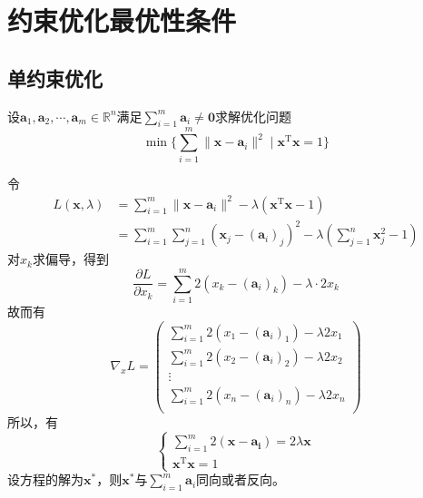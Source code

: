 \section{约束优化最优性条件}
\subsection{单约束优化}
\begin{example}
    设$\boldsymbol{a}_1,\boldsymbol{a}_2,\cdots,\boldsymbol{a}_m\in\mathbb{R}^n$满足$\sum\limits_{i = 1}^{m}\boldsymbol{a}_{i}\neq \boldsymbol{0}$求解优化问题
    \[
        \min\{\sum_{i=1}^{m}\|\boldsymbol{x}-\boldsymbol{a}_{i}\|^{2}\mid\boldsymbol{x}^{\mathrm{T}}\boldsymbol{x}=1\}
    \]
    \begin{solution}
        令
        \[
            \begin{aligned}
                L(\boldsymbol{x},\lambda)&=\sum\limits_{i = 1}^{m}\|\boldsymbol{x}-\boldsymbol{a}_{i}\|^{2}-\lambda(\boldsymbol{x}^{\mathrm{T}}\boldsymbol{x}-1)\\
                &=\sum_{i=1}^{m}\sum_{j=1}^{n}\left( \boldsymbol{x}_j-(\boldsymbol{a}_{i})_{j} \right)^2-\lambda\left( \sum_{j = 1}^{n}\boldsymbol{x}_j^2-1\right)
            \end{aligned}
        \]
        对$x_k$求偏导，得到
        \[
            \dfrac{\partial L}{\partial x_{k}} = \sum_{i = 1}^{m}2(x_{k}-(\boldsymbol{a}_{i})_{k})-\lambda\cdot 2 x_{k}
        \]
        故而有
        \[
            \nabla_{x}L = \begin{pmatrix}
                \sum_{i = 1}^{m}2(x_{1}-(\boldsymbol{a}_{i})_{1})-\lambda 2x_{1}\\
                \sum_{i = 1}^{m}2(x_{2}-(\boldsymbol{a}_{i})_{2})-\lambda 2x_{2}\\
                \vdots\\
                \sum_{i = 1}^{m}2(x_{n}-(\boldsymbol{a}_{i})_{n})-\lambda 2x_{n}\\
            \end{pmatrix} 
        \]
        所以，有
        \[
            \begin{cases}
                \sum\limits_{i = 1}^{m}2(\boldsymbol{x-\boldsymbol{a}_{i}}) = 2\lambda\boldsymbol{x}\\
                \boldsymbol{x}^{\mathrm{T}}\boldsymbol{x}=1
            \end{cases}
        \]
        设方程的解为$\boldsymbol{x}^*$，则$\boldsymbol{x}^*$与$\sum\limits_{i = 1}^{m}\boldsymbol{a}_i$同向或者反向。


\end{solution}
\end{example}
